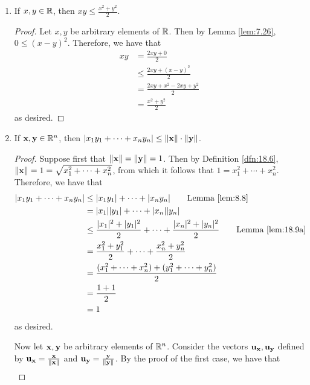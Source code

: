 \documentclass[../main.tex]{subfiles}
\begin{document}
\begin{lemma}\label{lem:18.9}\leavevmode
    \begin{enumerate}[label=\textup{(}\alph*\textup{)},ref={\thelemma\alph*}]
        \item \label{lem:18.9a}If $x,y\in\mathbb{R}$, then $xy\leq\frac{x^2+y^2}{2}$.
        \begin{proof}
            Let $x,y$ be arbitrary elements of $\mathbb{R}$. Then by Lemma \ref{lem:7.26}, $0\leq(x-y)^2$. Therefore, we have that
            \begin{align*}
                xy &= \frac{2xy+0}{2}\\
                &\leq \frac{2xy+(x-y)^2}{2}\\
                &= \frac{2xy+x^2-2xy+y^2}{2}\\
                &= \frac{x^2+y^2}{2}
            \end{align*}
            as desired.
        \end{proof}
        \item \label{lem:18.9b}If $\mathbf{x},\mathbf{y}\in\mathbb{R}^n$, then $|x_1y_1+\cdots+x_ny_n|\leq\norm{\mathbf{x}}\cdot\norm{\mathbf{y}}$.
        \begin{proof}
            Suppose first that $\norm{\mathbf{x}}=\norm{\mathbf{y}}=1$. Then by Definition \ref{dfn:18.6}, $\norm{\mathbf{x}}=1=\sqrt{x_1^2+\cdots+x_n^2}$, from which it follows that $1=x_1^2+\cdots+x_n^2$. Therefore, we have that
            \begin{align*}
                |x_1y_1+\cdots+x_ny_n| &\leq |x_1y_1|+\cdots+|x_ny_n|\tag*{Lemma \ref{lem:8.8}}\\
                &= |x_1||y_1|+\cdots+|x_n||y_n|\\
                &\leq \frac{|x_1|^2+|y_1|^2}{2}+\cdots+\frac{|x_n|^2+|y_n|^2}{2}\tag*{Lemma \ref{lem:18.9a}}\\
                &= \frac{x_1^2+y_1^2}{2}+\cdots+\frac{x_n^2+y_n^2}{2}\\
                &= \frac{(x_1^2+\cdots+x_n^2)+(y_1^2+\cdots+y_n^2)}{2}\\
                &= \frac{1+1}{2}\\
                &= 1
            \end{align*}
            as desired.\par
            Now let $\mathbf{x},\mathbf{y}$ be arbitrary elements of $\mathbb{R}^n$. Consider the vectors $\mathbf{u}_{\mathbf{x}},\mathbf{u}_{\mathbf{y}}$ defined by $\mathbf{u}_{\mathbf{x}}=\frac{\mathbf{x}}{\norm{\mathbf{x}}}$ and $\mathbf{u}_{\mathbf{y}}=\frac{\mathbf{y}}{\norm{\mathbf{y}}}$. By the proof of the first case, we have that
            \begin{align*}

\end{align*}
\end{proof}
\end{enumerate}
\end{lemma}
\end{document}
